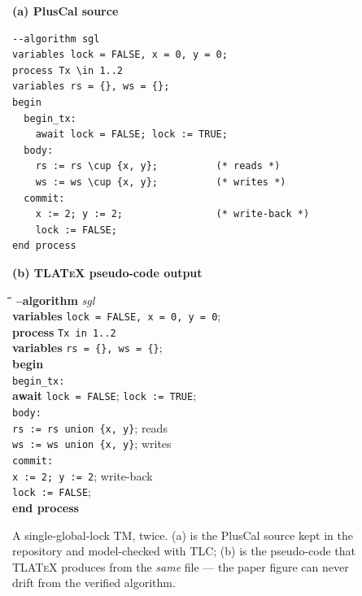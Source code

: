 \begin{figure}[ht]
\centering
\begin{minipage}[t]{0.47\textwidth}
\centering\textbf{(a) PlusCal source}\\[2pt]
\begin{lstlisting}[basicstyle=\ttfamily\footnotesize]
--algorithm sgl
variables lock = FALSE, x = 0, y = 0;
process Tx \in 1..2
variables rs = {}, ws = {};
begin
  begin_tx:
    await lock = FALSE; lock := TRUE;
  body:
    rs := rs \cup {x, y};          (* reads *)
    ws := ws \cup {x, y};          (* writes *)
  commit:
    x := 2; y := 2;                (* write-back *)
    lock := FALSE;
end process
\end{lstlisting}
\end{minipage}\hfill
\begin{minipage}[t]{0.47\textwidth}
\centering\textbf{(b) \textsc{TLATeX} pseudo-code output}\\[2pt]
{\footnotesize
\begin{tabbing}
  \hspace{0.9cm}\=\hspace{3.1cm}\=\hspace{2.6cm}\=\hspace{2.5cm}\=\kill
  \textbf{--algorithm} \emph{sgl} \\
  \textbf{variables} \> \texttt{lock = FALSE, x = 0, y = 0}; \\
  \textbf{process} \> \texttt{Tx in 1..2} \\
  \> \textbf{variables} \> \texttt{rs = \{\}, ws = \{\}}; \\
  \textbf{begin} \\
  \> \texttt{begin\_tx:} \\
  \> \> \textbf{await} \> \texttt{lock = FALSE}; \texttt{lock := TRUE}; \\
  \> \texttt{body:} \\
  \> \> \texttt{rs := rs union \{x, y\}}; \> \> reads \\
  \> \> \texttt{ws := ws union \{x, y\}}; \> \> writes \\
  \> \texttt{commit:} \\
  \> \> \texttt{x := 2; y := 2}; \> \> write-back \\
  \> \> \texttt{lock := FALSE}; \\
  \textbf{end process}
\end{tabbing}
}
\end{minipage}
\caption{A single-global-lock TM, twice. (a) is the PlusCal source kept in the repository and model-checked with TLC; (b) is the pseudo-code that \textsc{TLATeX} produces from the \emph{same} file --- the paper figure can never drift from the verified algorithm.}
\label{fig:pluscal-latex}
\end{figure}

